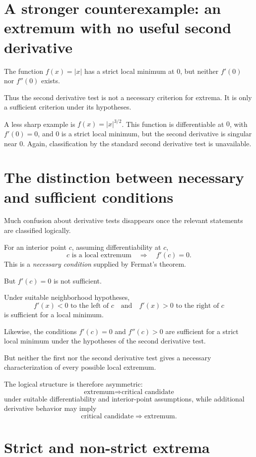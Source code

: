 \documentclass{essay}
\begin{document}
\section{A stronger counterexample: an extremum with no useful second derivative}

The function \(f(x)=|x|\) has a strict local minimum at \(0\), but neither \(f'(0)\) nor \(f''(0)\) exists.

Thus the second derivative test is not a necessary criterion for extrema. It is only a sufficient criterion under its hypotheses.

A less sharp example is \(f(x)=|x|^{3/2}\). This function is differentiable at \(0\), with \(f'(0)=0\), and \(0\) is a strict local minimum, but the second derivative is singular near \(0\). Again, classification by the standard second derivative test is unavailable.

\section{The distinction between necessary and sufficient conditions}

Much confusion about derivative tests disappears once the relevant statements are classified logically.

For an interior point \(c\), assuming differentiability at \(c\),
\[
  \text{\(c\) is a local extremum}
  \quad\Longrightarrow\quad
  f'(c)=0.
\]
This is a \emph{necessary condition} supplied by Fermat's theorem.

But \(f'(c)=0\) is not sufficient.

Under suitable neighborhood hypotheses,
\[ f'(x)<0\text{ to the left of }c \quad\text{and}\quad f'(x)>0\text{ to the right of }c \]
is sufficient for a local minimum.

Likewise, the conditions \(f'(c)=0\) and \(f''(c)>0\) are sufficient for a strict local minimum under the hypotheses of the second derivative test.

But neither the first nor the second derivative test gives a necessary characterization of every possible local extremum.

The logical structure is therefore asymmetric:
\[ \text{extremum} \Longrightarrow \text{critical candidate} \]
under suitable differentiability and interior-point assumptions, while additional derivative behavior may imply
\[ \text{critical candidate} \Longrightarrow \text{extremum}. \]

\section{Strict and non-strict extrema}
\end{document}
